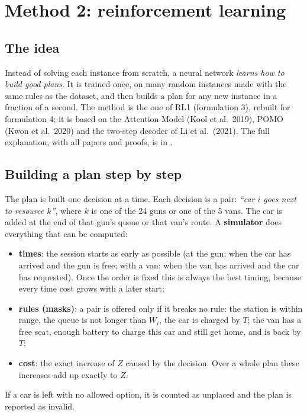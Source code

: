 \section{Method 2: reinforcement learning}
\label{sec:rlmethod}

\subsection{The idea}

Instead of solving each instance from scratch, a neural network \emph{learns how to build good plans}. It is trained once, on many random instances made with the same rules as the dataset, and then builds a plan for any new instance in a fraction of a second. The method is the one of RL1 (formulation 3), rebuilt for formulation 4; it is based on the Attention Model (Kool et al.\ 2019), POMO (Kwon et al.\ 2020) and the two-step decoder of Li et al.\ (2021). The full explanation, with all papers and proofs, is in .

\subsection{Building a plan step by step}

The plan is built one decision at a time. Each decision is a pair: \emph{``car $i$ goes next to resource $k$''}, where $k$ is one of the 24 guns or one of the 5 vans. The car is added at the end of that gun's queue or that van's route. A \textbf{simulator} does everything that can be computed:
\begin{itemize}
  \item \textbf{times}: the session starts as early as possible (at the gun: when the car has arrived and the gun is free; with a van: when the van has arrived and the car has requested). Once the order is fixed this is always the best timing, because every time cost grows with a later start;
  \item \textbf{rules (masks)}: a pair is offered only if it breaks no rule: the station is within range, the queue is not longer than $W_i$, the car is charged by $T$; the van has a free seat, enough battery to charge this car and still get home, and is back by $T$;
  \item \textbf{cost}: the exact increase of $Z$ caused by the decision. Over a whole plan these increases add up exactly to $Z$.
\end{itemize}
If a car is left with no allowed option, it is counted as unplaced and the plan is reported as invalid.

